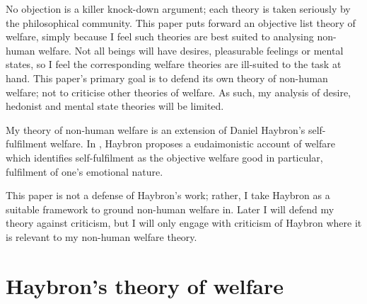 \documentclass{article}
\begin{document}
No objection is a killer knock-down argument; each theory is taken seriously by the philosophical community. This paper puts forward an objective list theory of welfare, simply because I feel such theories are best suited to analysing non-human welfare. Not all beings will have desires, pleasurable feelings or mental states, so I feel the corresponding welfare theories are ill-suited to the task at hand. This paper's primary goal is to defend its own theory of non-human welfare; not to criticise other theories of welfare. As such, my analysis of desire, hedonist and mental state theories will be limited.

My theory of non-human welfare is an extension of Daniel Haybron's self-fulfilment welfare. In \citep[chapter 9]{haybron2008pursuit}, Haybron proposes a eudaimonistic account of welfare which identifies self-fulfilment as the objective welfare good \textemdash{} in particular, fulfilment of one's emotional nature. 

This paper is not a defense of Haybron's work; rather, I take Haybron as a suitable framework to ground non-human welfare in. Later I will defend my theory against criticism, but I will only engage with criticism of Haybron where it is relevant to my non-human welfare theory.

\section{Haybron's theory of welfare}






\end{document}
